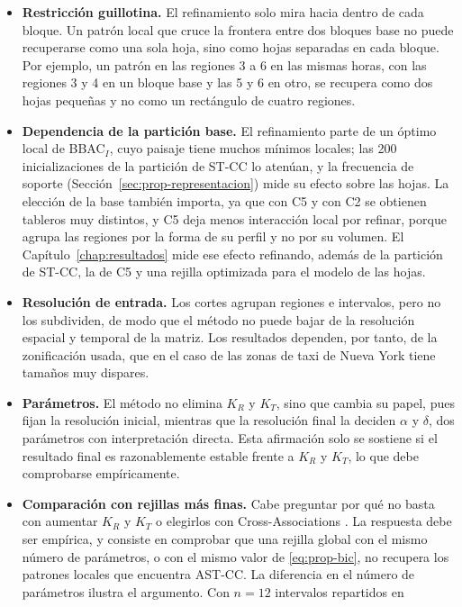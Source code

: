 \begin{itemize}
  \item \textbf{Restricción guillotina.} El refinamiento solo mira hacia
  dentro de cada bloque. Un patrón local que cruce la frontera entre dos
  bloques base no puede recuperarse como una sola hoja, sino como hojas
  separadas en cada bloque. Por ejemplo, un patrón en las regiones 3 a 6 en las
  mismas horas, con las regiones 3 y 4 en un bloque base y las 5 y 6 en otro, se
  recupera como dos hojas pequeñas y no como un rectángulo de cuatro regiones.
  \item \textbf{Dependencia de la partición base.} El refinamiento parte de un
  óptimo local de BBAC$_I$, cuyo paisaje tiene muchos mínimos locales; las 200
  inicializaciones de la partición de ST-CC lo atenúan, y la frecuencia
  de soporte (Sección~\ref{sec:prop-representacion}) mide su efecto sobre las
  hojas. La elección de la base también importa, ya que con C5 y con C2 se obtienen
  tableros muy distintos, y C5 deja menos interacción local por refinar, porque
  agrupa las regiones por la forma de su perfil y no por su volumen. El
  Capítulo~\ref{chap:resultados} mide ese efecto refinando, además de la partición
  de ST-CC, la de C5 y una rejilla optimizada para el modelo de las hojas.
  \item \textbf{Resolución de entrada.} Los cortes agrupan regiones e
  intervalos, pero no los subdividen, de modo que el método no puede bajar de la resolución
  espacial y temporal de la matriz. Los resultados dependen, por tanto, de la
  zonificación usada, que en el caso de las zonas de taxi de Nueva York tiene
  tamaños muy dispares.
  \item \textbf{Parámetros.} El método no elimina $K_R$ y $K_T$, sino que
  cambia su papel, pues fijan la resolución inicial, mientras que la resolución
  final la deciden $\alpha$ y $\delta$, dos parámetros con interpretación
  directa. Esta afirmación solo se sostiene si el resultado final es
  razonablemente estable frente a $K_R$ y $K_T$, lo que debe comprobarse
  empíricamente.
  \item \textbf{Comparación con rejillas más finas.} Cabe preguntar por qué
  no basta con aumentar $K_R$ y $K_T$ o elegirlos con Cross-Associations
  \citep{Chakrabarti2004}. La respuesta debe ser empírica, y consiste en comprobar que una rejilla global con
  el mismo número de parámetros, o con el mismo valor de \eqref{eq:prop-bic},
  no recupera los patrones locales que encuentra AST-CC. La diferencia en el
  número de parámetros ilustra el argumento. Con $n=12$ intervalos repartidos en

\end{itemize}
